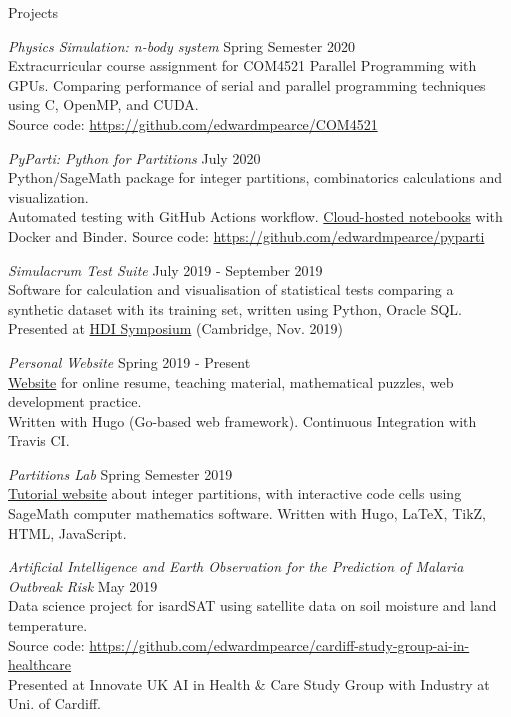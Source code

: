\documentclass{resume} %
\begin{document}
\begin{rSection}{Projects}

{\em Physics Simulation: n-body system} \hfill Spring Semester 2020 \\
Extracurricular course assignment for COM4521 Parallel Programming with GPUs. Comparing performance of serial and parallel programming techniques using C, OpenMP, and CUDA.\\
Source code: \href{https://github.com/edwardmpearce/COM4521}{https://github.com/edwardmpearce/COM4521}

{\em PyParti: Python for Partitions} \hfill July 2020 \\
Python/SageMath package for integer partitions, combinatorics calculations and visualization. \\
Automated testing with GitHub Actions workflow.
\href{https://mybinder.org/v2/gh/edwardmpearce/pyparti/master}{Cloud-hosted notebooks} with Docker and Binder.
Source code: \href{https://github.com/edwardmpearce/pyparti}{https://github.com/edwardmpearce/pyparti}

{\em Simulacrum Test Suite} \hfill July 2019 - September 2019 \\
Software for calculation and visualisation of statistical tests comparing a synthetic dataset with its training set, written using Python, Oracle SQL.
Presented at \href{https://healthdatainsight.org.uk/hdi-symposium-2019/}{HDI Symposium} (Cambridge, Nov. 2019)

{\em Personal Website} \hfill Spring 2019 - Present \\
\href{https://edwardmpearce.github.io/}{Website} for online resume, teaching material, mathematical puzzles, web development practice.\\
Written with Hugo (Go-based web framework). Continuous Integration with Travis CI.

{\em Partitions Lab} \hfill Spring Semester 2019 \\
\href{https://edwardmpearce.github.io/tutorial-partitions/}{Tutorial website} about integer partitions, with interactive code cells using SageMath computer mathematics software. 
Written with Hugo, LaTeX, TikZ, HTML, JavaScript.

{\em Artificial Intelligence and Earth Observation for the Prediction of Malaria Outbreak Risk} \hfill May 2019 \\
Data science project for isardSAT using satellite data on soil moisture and land temperature. \\
Source code: \href{https://github.com/edwardmpearce/cardiff-study-group-ai-in-healthcare}{https://github.com/edwardmpearce/cardiff-study-group-ai-in-healthcare}\\
Presented at Innovate UK AI in Health \& Care Study Group with Industry at Uni. of Cardiff.



\end{rSection}
\end{document}
